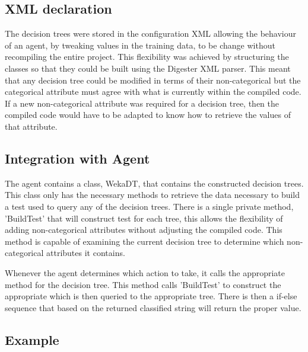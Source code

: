 \subsection{XML declaration}

The decision trees were stored in the configuration XML allowing the behaviour of an agent, by tweaking values
in the training data, to be change without recompiling the entire project.  This flexibility was achieved by 
structuring the classes so that they could be built using the Digester XML parser.  This meant that any decision
tree could be modified in terms of their non-categorical but the categorical attribute must agree with what is 
currently within the compiled code.  If a new non-categorical attribute was required for a decision tree, then 
the compiled code would have to be adapted to know how to retrieve the values of that attribute.

\subsection{Integration with Agent}

The agent contains a class, WekaDT, that contains the constructed decision trees.  This class only has
the necessary methods to retrieve the data necessary to build a test used to query any of the decision
trees.  There is a single private method, 'BuildTest' that will construct test for each tree, this allows the flexibility
of adding non-categorical attributes without adjusting the compiled code.  This method is capable of
examining the current decision tree to determine which non-categorical attributes it contains.

Whenever the agent determines which action to take, it calls the appropriate method for the decision 
tree.  This method calls 'BuildTest' to construct the appropriate which is then queried to the
appropriate tree.  There is then a if-else sequence that based on the returned classified string
will return the proper value.

\subsection{Example}


